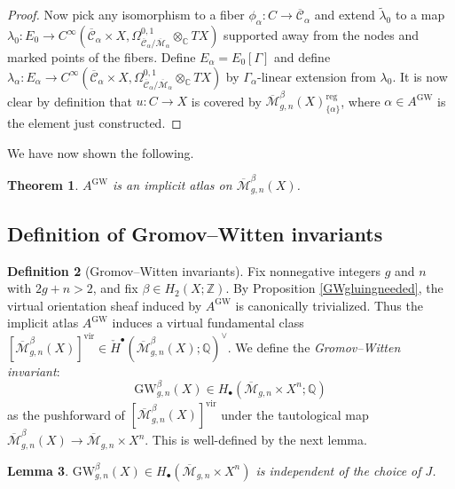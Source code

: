\documentclass[12pt]{article}
\newtheorem{theorem}{Theorem}[subsection]
\newtheorem{lemma}[theorem]{Lemma}
\theoremstyle{definition}
\newtheorem{definition}[theorem]{Definition}
\theoremstyle{remark}
\numberwithin{equation}{subsection}
\newcommand{\CC}{\mathbb C}
\newcommand{\ZZ}{\mathbb Z}
\newcommand{\QQ}{\mathbb Q}
\newcommand{\cH}{\check H}
\newcommand{\Mbar}{\overline{\mathcal M}}
\newcommand{\Cbar}{\overline{\mathcal C}}
\newcommand{\vir}{\mathrm{vir}}
\newcommand{\GW}{\mathrm{GW}}
\newcommand{\reg}{\mathrm{reg}}
\begin{document}
\begin{proof}
Now pick any isomorphism to a fiber $\phi_\alpha:C\to\Cbar_\alpha$ and extend $\tilde\lambda_0$ to a map $\lambda_0:E_0\to C^\infty(\Cbar_\alpha\times X,\Omega^{0,1}_{\Cbar_\alpha/\Mbar_\alpha}\otimes_\CC TX)$ supported away from the nodes and marked points of the fibers.  Define $E_\alpha=E_0[\Gamma]$ and define $\lambda_\alpha:E_\alpha\to C^\infty(\Cbar_\alpha\times X,\Omega^{0,1}_{\Cbar_\alpha/\Mbar_\alpha}\otimes_\CC TX)$ by $\Gamma_\alpha$-linear extension from $\lambda_0$.  It is now clear by definition that $u:C\to X$ is covered by $\Mbar_{g,n}^\beta(X)_{\{\alpha\}}^\reg$, where $\alpha\in A^\GW$ is the element just constructed.
\end{proof}

We have now shown the following.

\begin{theorem}
$A^\GW$ is an implicit atlas on $\Mbar_{g,n}^\beta(X)$.
\end{theorem}

\subsection{Definition of Gromov--Witten invariants}

\begin{definition}[Gromov--Witten invariants]
Fix nonnegative integers $g$ and $n$ with $2g+n>2$, and fix $\beta\in H_2(X;\ZZ)$.  By Proposition \ref{GWgluingneeded}, the virtual orientation sheaf induced by $A^\GW$ is canonically trivialized.  Thus the implicit atlas $A^\GW$ induces a virtual fundamental class $[\Mbar_{g,n}^\beta(X)]^\vir\in\cH^\bullet(\Mbar_{g,n}^\beta(X);\QQ)^\vee$.  We define the \emph{Gromov--Witten invariant}:
\begin{equation}
\GW_{g,n}^\beta(X)\in H_\bullet(\Mbar_{g,n}\times X^n;\QQ)
\end{equation}
as the pushforward of $[\Mbar_{g,n}^\beta(X)]^\vir$ under the tautological map $\Mbar_{g,n}^\beta(X)\to\Mbar_{g,n}\times X^n$.  This is well-defined by the next lemma.
\end{definition}

\begin{lemma}
$\GW_{g,n}^\beta(X)\in H_\bullet(\Mbar_{g,n}\times X^n)$ is independent of the choice of $J$.
\end{lemma}
\end{document}
